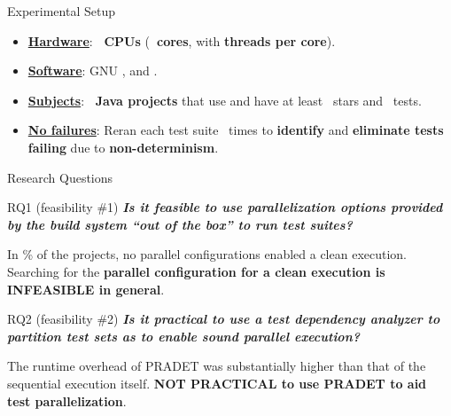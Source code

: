 \documentclass{beamer}
\begin{document}
\begin{frame}{Experimental Setup}
	\begin{itemize}
		\item[]{\textbf{\underline{Hardware}}: \textbf{\rsm \NumCPUs\ CPUs} (\textbf{\rsm \NumCores\ cores}, with \textbf{ threads per core}).}\pause
		\item[]{\textbf{\underline{Software}}: GNU \textbf{} \BashVersion, and \textbf{} \MavenVersion.}\pause
		\item[]{\textbf{\underline{Subjects}}: \textbf{\rsm \NumProjects\ Java projects} that use \textbf{} and have at least \NumStars\ stars and \NumTests\ tests.}\pause
		\item[]{\textbf{\underline{No failures}}: Reran each test suite \NumRepeatsManifest\ times to \textbf{\rsm identify} and \textbf{\rsm eliminate tests failing} due to \textbf{\rsm non-determinism}.}
	\end{itemize}
\end{frame}

\begingroup
\renewcommand{\disp}{}
\begin{frame}
	\begin{center}
		Research Questions
	\end{center}
\end{frame}
\endgroup
\addtocounter{framenumber}{-1}

\begin{frame}{RQ1 (feasibility \#1)}
	\textbf{\textit{Is it {\rsm feasible to use parallelization} options provided by the build system ``{\rsm out of the box}'' to run test suites?}}\pause
	\begin{center}
		\begin{tcolorbox}
			In \NumProjectsParExecFailsPercentage\% of the projects, no parallel configurations enabled a clean execution. Searching for the {\color{red}\textbf{parallel configuration for a clean execution is INFEASIBLE in general}}.
		\end{tcolorbox}
	\end{center}
\end{frame}

\begin{frame}{RQ2 (feasibility \#2)}
	\textbf{\textit{Is it {\rsm practical to use a test dependency analyzer} to partition test sets as to enable {\rsm sound} parallel execution?}}\pause
	\begin{center}
		\begin{tcolorbox}
			The runtime overhead of PRADET was substantially higher than that of the sequential execution itself. \textbf{\color{red} NOT PRACTICAL to use PRADET to aid test parallelization}.
		\end{tcolorbox}
	\end{center}
\end{frame}
\end{document}
